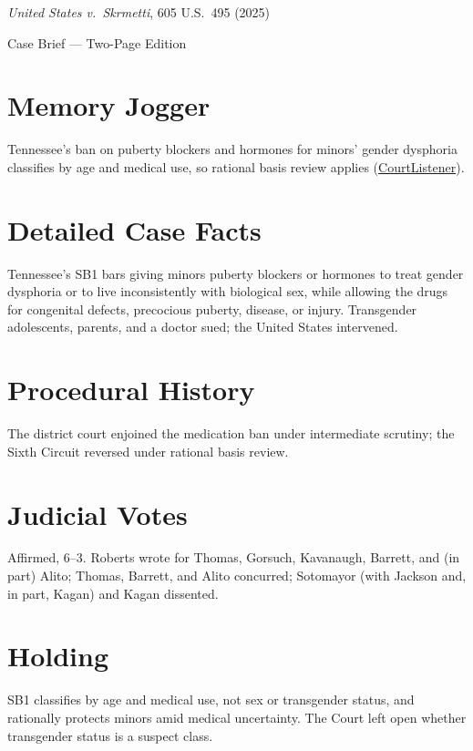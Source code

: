 \documentclass[12pt]{article}
\begin{document}
\begin{center}
{\LARGE \textit{United States v.\ Skrmetti}, 605 U.S.\ 495 (2025)\par}
\vspace{0.5em}
{\large Case Brief --- Two-Page Edition\par}
\end{center}

\section{Memory Jogger}
Tennessee's ban on puberty blockers and hormones for minors' gender dysphoria classifies by age and medical use, so rational basis review applies (\href{https://www.courtlistener.com/opinion/10776831/united-states-v-skrmetti/}{CourtListener}).

\section{Detailed Case Facts}
Tennessee's SB1 bars giving minors puberty blockers or hormones to treat gender dysphoria or to live inconsistently with biological sex, while allowing the drugs for congenital defects, precocious puberty, disease, or injury. Transgender adolescents, parents, and a doctor sued; the United States intervened.

\section{Procedural History}
The district court enjoined the medication ban under intermediate scrutiny; the Sixth Circuit reversed under rational basis review.

\section{Judicial Votes}
Affirmed, 6--3. Roberts wrote for Thomas, Gorsuch, Kavanaugh, Barrett, and (in part) Alito; Thomas, Barrett, and Alito concurred; Sotomayor (with Jackson and, in part, Kagan) and Kagan dissented.

\section{Holding}
SB1 classifies by age and medical use, not sex or transgender status, and rationally protects minors amid medical uncertainty. The Court left open whether transgender status is a suspect class.
\end{document}

